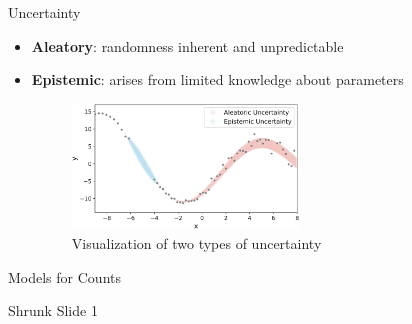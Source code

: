 \documentclass[english]{beamer}\usepackage[]{graphicx}\usepackage[]{xcolor}
\begin{document}
\begin{frame}{Uncertainty}

\begin{itemize}
\item \textbf{Aleatory}: randomness inherent and unpredictable
\item \textbf{Epistemic}: arises from limited knowledge about parameters

\begin{figure}[h]
    \centering
    \includegraphics[width=60mm,scale=0.7]{illustration_uncertainty.png}
    \caption{Visualization of two types of uncertainty \citep{yang2023explainable}}
    \label{fig:uncertainty}
\end{figure}


\end{itemize}


\end{frame}

\begin{frame}{Models for Counts}

\begin{table}[h!]
\centering
{}
\caption{Aleatory and epistemic uncertainty in accrual shown by different models for counts.}
\label{tab:count_modeling}
\end{table}

\end{frame}


\begin{frame}[shrink = 5]{Shrunk Slide 1}


\end{frame}
\end{document}
